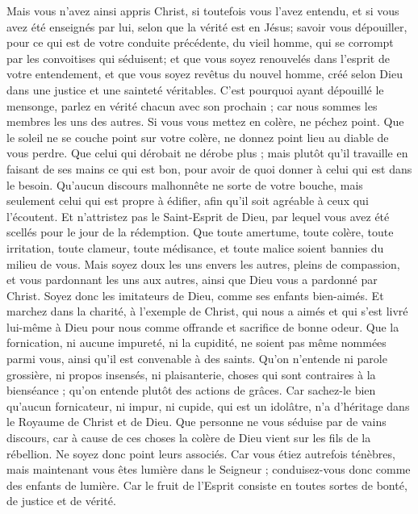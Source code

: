 \begin{multicols}{2}
Mais vous n'avez ainsi appris Christ,
si toutefois vous l'avez entendu, et si vous avez été enseignés par lui, selon que la vérité est en Jésus; 
savoir vous dépouiller, pour ce qui est de votre conduite précédente, du vieil homme, qui se corrompt par les convoitises qui séduisent; 
et que vous soyez renouvelés dans l'esprit de votre entendement,
et que vous soyez revêtus du nouvel homme, créé selon Dieu dans une justice et une sainteté véritables.
C'est pourquoi ayant dépouillé le mensonge, parlez en vérité chacun avec son prochain ; car nous sommes les membres les uns des autres.
Si vous vous mettez en colère, ne péchez point. Que le soleil ne se couche point sur votre colère,
ne donnez point lieu au diable de vous perdre.
Que celui qui dérobait ne dérobe plus ; mais plutôt qu'il travaille en faisant de ses mains ce qui est bon, pour avoir de quoi donner à celui qui est dans le besoin.
Qu'aucun discours malhonnête ne sorte de votre bouche, mais seulement celui qui est propre à édifier, afin qu'il soit agréable à ceux qui l'écoutent.
Et n'attristez pas le Saint-Esprit de Dieu, par lequel vous avez été scellés pour le jour de la rédemption.
Que toute amertume, toute colère, toute irritation, toute clameur, toute médisance, et toute malice soient bannies du milieu de vous.
Mais soyez doux les uns envers les autres, pleins de compassion, et vous pardonnant les uns aux autres, ainsi que Dieu vous a pardonné par Christ.
\VerseOne{}Soyez donc les imitateurs de Dieu, comme ses enfants bien-aimés.
Et marchez dans la charité, à l'exemple de Christ, qui nous a aimés et qui s'est livré lui-même à Dieu pour nous comme offrande et sacrifice de bonne odeur.
Que la fornication, ni aucune impureté, ni la cupidité, ne soient pas même nommées parmi vous, ainsi qu'il est convenable à des saints.
Qu'on n'entende ni parole grossière, ni propos insensés, ni plaisanterie, choses qui sont contraires à la bienséance ; qu'on entende plutôt des actions de grâces.
Car sachez-le bien qu'aucun fornicateur, ni impur, ni cupide, qui est un idolâtre, n'a d'héritage dans le Royaume de Christ et de Dieu.
Que personne ne vous séduise par de vains discours, car à cause de ces choses la colère de Dieu vient sur les fils de la rébellion.
Ne soyez donc point leurs associés.
Car vous étiez autrefois ténèbres, mais maintenant vous êtes lumière dans le Seigneur ; conduisez-vous donc comme des enfants de lumière.
Car le fruit de l'Esprit consiste en toutes sortes de bonté, de justice et de vérité.

\end{multicols}
